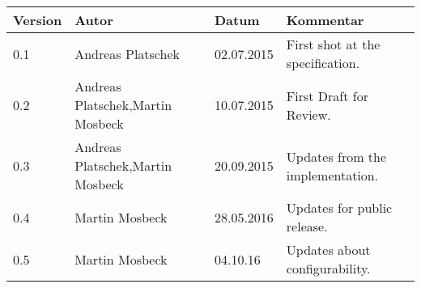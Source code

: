 
\begin{table}[h]
\begin{tabular*}{14.7cm}{|p{}|p{}|p{2cm}|p{}|}
\hline 
Version & Autor & Datum & Kommentar \\[2pt]
\hline
\hline

0.1 & Andreas Platschek & 02.07.2015 & First shot at the specification. \\[2pt]
\hline 
0.2 & Andreas Platschek,\newline Martin Mosbeck & 10.07.2015 & First Draft for Review. \\[2pt]
\hline 
0.3 & Andreas Platschek,\newline Martin Mosbeck & 20.09.2015 & Updates from the implementation. \\[2pt]
\hline 
0.4 & Martin Mosbeck & 28.05.2016 & Updates for public release. \\[2pt]
\hline 
0.5 & Martin Mosbeck & 04.10.16 & Updates about configurability. \\[2pt]
\hline
\end{tabular*}
\end{table}

